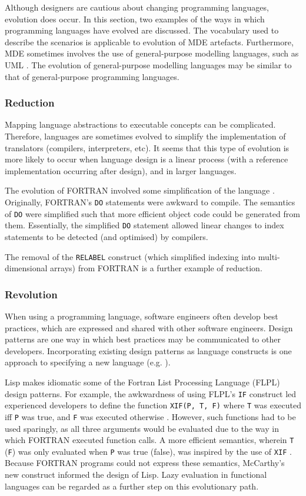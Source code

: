 Although designers are cautious about changing programming languages, evolution does occur. In this section, two examples of the ways in which programming languages have evolved are discussed. The vocabulary used to describe the scenarios is applicable to evolution of MDE artefacts. Furthermore, MDE sometimes involves the use of general-purpose modelling languages, such as UML \cite{uml212}. The evolution of general-purpose modelling languages may be similar to that of general-purpose programming languages.

\subsubsection{Reduction}
Mapping language abstractions to executable concepts can be complicated. Therefore, languages are sometimes evolved to simplify the implementation of translators (compilers, interpreters, etc). It seems that this type of evolution is more likely to occur when language design is a linear process (with a reference implementation occurring after design), and in larger languages.

The \cc evolution of FORTRAN involved some simplification of the language \cite{backus78history}. Originally, FORTRAN's \verb|DO| statements were awkward to compile. The semantics of \verb|DO| were simplified such that more efficient object code could be generated from them. Essentially, the simplified \verb|DO| statement allowed linear changes to index statements to be detected (and optimised) by compilers.

The removal of the \verb|RELABEL| construct (which simplified indexing into multi-dimensional arrays) from FORTRAN \cite{backus78history} is a further example of reduction.

\subsubsection{Revolution}
When using a programming language, software engineers often develop best practices, which are expressed and shared with other software engineers. Design patterns are one way in which best practices may be communicated to other developers. Incorporating existing design patterns as language constructs is one approach to specifying a new language (e.g. \cite{bosch98patterns}).

Lisp makes idiomatic some of the Fortran List Processing Language (FLPL) design patterns. For \cc example, the awkwardness of using FLPL's \verb|IF| construct led experienced developers to define the function \verb|XIF(P, T, F)| where \verb|T| was executed iff \verb|P| was true, and \verb|F| was executed otherwise \cite{mcarthy78lisp}. However, such functions had to be used sparingly, as all three arguments would be evaluated due to the way in which FORTRAN executed function calls.   A more efficient semantics, wherein \verb|T| (\verb|F|) was only evaluated when  \verb|P| was true (false), was inspired by the use of \verb|XIF| \cite{mcarthy78lisp}. Because FORTRAN programs could not express these semantics, McCarthy's new construct informed the design of Lisp. Lazy evaluation in functional languages can be regarded as a further step on this evolutionary path.


